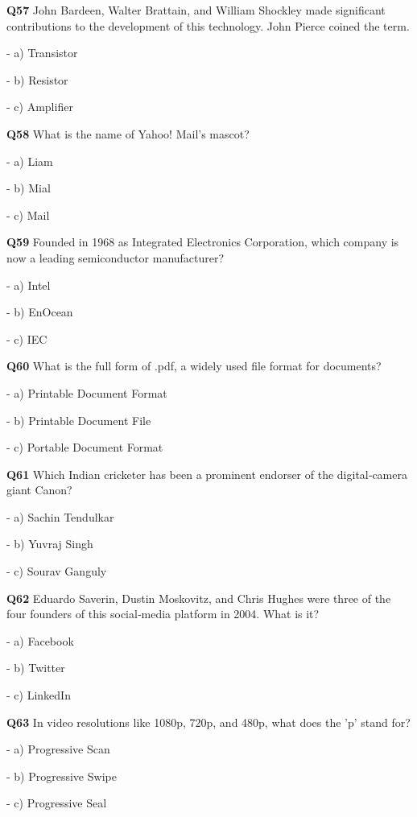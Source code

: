 \textbf{Q57} John Bardeen, Walter Brattain, and William Shockley made significant contributions to the development of this technology. John Pierce coined the term.\par
\quad - a) Transistor\par
\quad - b) Resistor\par
\quad - c) Amplifier\par

\textbf{Q58} What is the name of Yahoo! Mail's mascot?\par
\quad - a) Liam\par
\quad - b) Mial\par
\quad - c) Mail\par

\textbf{Q59} Founded in 1968 as Integrated Electronics Corporation, which company is now a leading semiconductor manufacturer?\par
\quad - a) Intel\par
\quad - b) EnOcean\par
\quad - c) IEC\par

\textbf{Q60} What is the full form of .pdf, a widely used file format for documents?\par
\quad - a) Printable Document Format\par
\quad - b) Printable Document File\par
\quad - c) Portable Document Format\par

\textbf{Q61} Which Indian cricketer has been a prominent endorser of the digital‑camera giant Canon?\par
\quad - a) Sachin Tendulkar\par
\quad - b) Yuvraj Singh\par
\quad - c) Sourav Ganguly\par

\textbf{Q62} Eduardo Saverin, Dustin Moskovitz, and Chris Hughes were three of the four founders of this social‑media platform in 2004. What is it?\par
\quad - a) Facebook\par
\quad - b) Twitter\par
\quad - c) LinkedIn\par

\textbf{Q63} In video resolutions like 1080p, 720p, and 480p, what does the 'p' stand for?\par
\quad - a) Progressive Scan\par
\quad - b) Progressive Swipe\par
\quad - c) Progressive Seal\par

